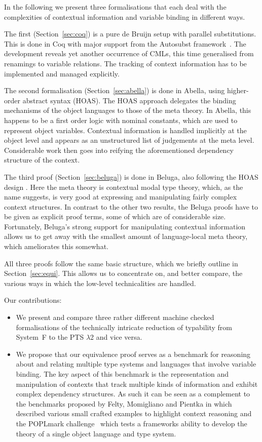 \documentclass[a4paper,UKenglish]{lipics-v2016}
\newcommand{\SysL}{$\lambda$2\xspace}
\begin{document}
In the following we present three formalisations that each deal with the complexities of contextual information and variable binding in different ways.

The first (Section~\ref{sec:coq}) is a pure de Bruijn setup with parallel substitutions.
This is done in Coq with major support from the Autosubst framework~\cite{DBLP:conf/itp/SchaferTS15}.
The development reveals yet another occurrence of CMLs, this time generalised from renamings to variable relations.
The tracking of context information has to be implemented and managed explicitly.

The second formalisation (Section~\ref{sec:abella}) is done in Abella, using higher-order abstract syntax (HOAS)\cite{AbellaTutorial}.
The HOAS approach delegates the binding mechanisms of the object languages to those of the meta theory.
In Abella, this happens to be a first order logic with nominal constants, which are used to represent object variables.
Contextual information is handled implicitly at the object level and appears as an unstructured list of judgements at the meta level.
Considerable work then goes into reifying the aforementioned dependency structure of the context.

The third proof (Section~\ref{sec:beluga}) is done in Beluga, also following the HOAS design \cite{Pientka:CADE15}.
Here the meta theory is contextual modal type theory, which, as the name suggests, is very good at expressing and manipulating fairly complex context structures.
In contrast to the other two results, the Beluga proofs have to be given as explicit proof terms, some of which are of considerable size.
Fortunately, Beluga's strong support for manipulating contextual information allows us to get away with the smallest amount of language-local meta theory, which ameliorates this somewhat.

All three proofs follow the same basic structure, which we briefly outline in Section~\ref{sec:equi}.
This allows us to concentrate on, and better compare, the various ways in which the low-level technicalities are handled.

Our contributions:
\begin{itemize}
\item We present and compare three rather different machine checked formalisations of the technically intricate reduction of typability from System~F to the PTS \SysL and vice versa.
\item We propose that our equivalence proof serves as a benchmark for reasoning about and relating multiple type systems and languages that involve variable binding.
  The key aspect of this benchmark is the representation and manipulation of contexts that track multiple kinds of information and exhibit complex dependency structures.
  As such it can be seen as a complement to the benchmarks proposed by Felty, Momigliano and Pientka in \cite{Felty:ITP10,Felty:orbi-survey} which described various small crafted examples to highlight context reasoning and the POPLmark challenge~\cite{poplmark} which tests a frameworks ability to develop the theory of a single object language and type system.
\end{itemize}
\end{document}
